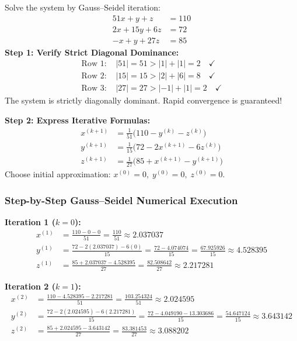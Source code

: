 \begin{examplebox}
Solve the system by Gauss--Seidel iteration:
\begin{align}
    51x + y + z &= 110 \\
    2x + 15y + 6z &= 72 \\
    -x + y + 27z &= 85
\end{align}
\textbf{Step 1: Verify Strict Diagonal Dominance:}
\begin{align}
    \text{Row 1: } & |51| = 51 > |1| + |1| = 2 \quad \checkmark \\
    \text{Row 2: } & |15| = 15 > |2| + |6| = 8 \quad \checkmark \\
    \text{Row 3: } & |27| = 27 > |-1| + |1| = 2 \quad \checkmark
\end{align}
The system is strictly diagonally dominant. Rapid convergence is guaranteed!

\textbf{Step 2: Express Iterative Formulas:}
\begin{align}
    x^{(k+1)} &= \frac{1}{51}\big(110 - y^{(k)} - z^{(k)}\big) \\
    y^{(k+1)} &= \frac{1}{15}\big(72 - 2x^{(k+1)} - 6z^{(k)}\big) \\
    z^{(k+1)} &= \frac{1}{27}\big(85 + x^{(k+1)} - y^{(k+1)}\big)
\end{align}
Choose initial approximation: $x^{(0)} = 0, \; y^{(0)} = 0, \; z^{(0)} = 0$.
\end{examplebox}

\subsubsection*{Step-by-Step Gauss--Seidel Numerical Execution}

\textbf{Iteration 1 ($k = 0$):}
\begin{align}
    x^{(1)} &= \frac{110 - 0 - 0}{51} = \frac{110}{51} \approx \mathbf{2.037037} \\
    y^{(1)} &= \frac{72 - 2(2.037037) - 6(0)}{15} = \frac{72 - 4.074074}{15} = \frac{67.925926}{15} \approx \mathbf{4.528395} \\
    z^{(1)} &= \frac{85 + 2.037037 - 4.528395}{27} = \frac{82.508642}{27} \approx \mathbf{2.217281}
\end{align}

\textbf{Iteration 2 ($k = 1$):}
\begin{align}
    x^{(2)} &= \frac{110 - 4.528395 - 2.217281}{51} = \frac{103.254324}{51} \approx \mathbf{2.024595} \\
    y^{(2)} &= \frac{72 - 2(2.024595) - 6(2.217281)}{15} = \frac{72 - 4.049190 - 13.303686}{15} = \frac{54.647124}{15} \approx \mathbf{3.643142} \\
    z^{(2)} &= \frac{85 + 2.024595 - 3.643142}{27} = \frac{83.381453}{27} \approx \mathbf{3.088202}
\end{align}


